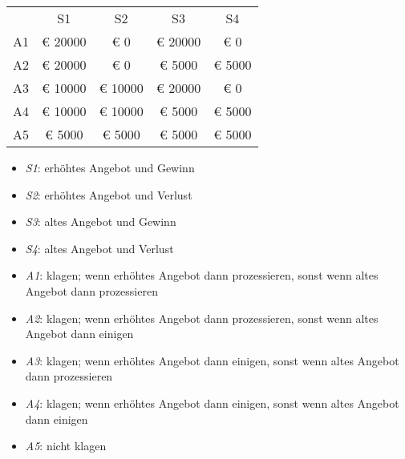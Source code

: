 \begin{tabular}{c|c|c|c|c|}
\multicolumn{1}{c}{}  & \multicolumn{1}{c}{S1}  & \multicolumn{1}{c}{S2}  & \multicolumn{1}{c}{S3}  & \multicolumn{1}{c}{S4} \\ \cline{2-5}
 A1 & € 20000 & € 0 & € 20000 & € 0 \\ \cline{2-5}
 A2 & € 20000 & € 0 & € 5000 & € 5000 \\ \cline{2-5}
 A3 & € 10000 & € 10000 & € 20000 & € 0 \\ \cline{2-5}
 A4 & € 10000 & € 10000 & € 5000 & € 5000 \\ \cline{2-5}
 A5 & € 5000 & € 5000 & € 5000 & € 5000 \\ \cline{2-5}
\end{tabular}
\begin{itemize}
\item {\em S1}: erhöhtes Angebot und Gewinn

\item {\em S2}: erhöhtes Angebot und Verlust

\item {\em S3}: altes Angebot und Gewinn

\item {\em S4}: altes Angebot und Verlust

\end{itemize}
\begin{itemize}
\item {\em A1}: klagen;  wenn erhöhtes Angebot dann prozessieren,  sonst wenn altes Angebot dann prozessieren

\item {\em A2}: klagen;  wenn erhöhtes Angebot dann prozessieren,  sonst wenn altes Angebot dann einigen

\item {\em A3}: klagen;  wenn erhöhtes Angebot dann einigen,  sonst wenn altes Angebot dann prozessieren

\item {\em A4}: klagen;  wenn erhöhtes Angebot dann einigen,  sonst wenn altes Angebot dann einigen

\item {\em A5}: nicht klagen

\end{itemize}
